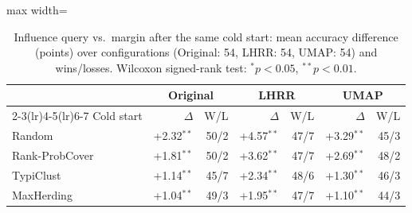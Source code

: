\begin{table}[t]
\centering
\caption{Influence query vs.\ margin after the same cold start: mean accuracy difference (points) over configurations (Original: 54, LHRR: 54, UMAP: 54) and wins/losses. Wilcoxon signed-rank test: $^{*}p<0.05$, $^{**}p<0.01$.}
\label{tab:plugin}
\footnotesize
\begin{adjustbox}{max width=\columnwidth}
\begin{tabular}{lrrrrrr}
\toprule
& \multicolumn{2}{c}{Original} & \multicolumn{2}{c}{LHRR} & \multicolumn{2}{c}{UMAP} \\
\cmidrule(lr){2-3}\cmidrule(lr){4-5}\cmidrule(lr){6-7}
Cold start & $\Delta$ & W/L & $\Delta$ & W/L & $\Delta$ & W/L \\
\midrule
Random & +2.32$^{**}$ & 50/2 & +4.57$^{**}$ & 47/7 & +3.29$^{**}$ & 45/3 \\
Rank-ProbCover & +1.81$^{**}$ & 50/2 & +3.62$^{**}$ & 47/7 & +2.69$^{**}$ & 48/2 \\
TypiClust & +1.14$^{**}$ & 45/7 & +2.34$^{**}$ & 48/6 & +1.30$^{**}$ & 46/3 \\
MaxHerding & +1.04$^{**}$ & 49/3 & +1.95$^{**}$ & 47/7 & +1.10$^{**}$ & 44/3 \\
\bottomrule
\end{tabular}
\end{adjustbox}
\end{table}
